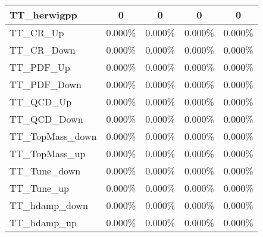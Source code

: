 \begin{table}[]
{\begin{tabular}{|l|c|c|c|c|}
TT\_herwigpp                      & 0                       & 0                       & 0                      & 0                       \\ \hline         
TT\_CR\_Up                        & 0.000\%                           & 0.000\%                          & 0.000\%                         & 0.000\%                          \\ \hline        
TT\_CR\_Down                      & 0.000\%                         & 0.000\%                        & 0.000\%                       & 0.000\%                        \\ \hline        
TT\_PDF\_Up                        & 0.000\%                         & 0.000\%                         & 0.000\%                        & 0.000\%                       \\ \hline    
TT\_PDF\_Down                      & 0.000\%                       & 0.000\%                       & 0.000\%                      & 0.000\%                       \\ \hline    
TT\_QCD\_Up                        & 0.000\%                         & 0.000\%                         & 0.000\%                        & 0.000\%                       \\ \hline    
TT\_QCD\_Down                      & 0.000\%                       & 0.000\%                       & 0.000\%                      & 0.000\%                       \\ \hline    
TT\_TopMass\_down                      & 0.000\%                       & 0.000\%                       & 0.000\%                      & 0.000\%                       \\ \hline    
TT\_TopMass\_up                      & 0.000\%                       & 0.000\%                       & 0.000\%                      & 0.000\%                       \\ \hline        
TT\_Tune\_down            & 0.000\%             & 0.000\%             & 0.000\%            & 0.000\%             \\ \hline      
TT\_Tune\_up              & 0.000\%               & 0.000\%               & 0.000\%              & 0.000\%               \\ \hline    
TT\_hdamp\_down                  & 0.000\%                         & 0.000\%                      & 0.000\%                        & 0.000\%                   \\ \hline
TT\_hdamp\_up                    & 0.000\%                           & 0.000\%                        & 0.000\%                          & 0.000\%                     \\ \hline

\end{tabular}}
\end{table}
